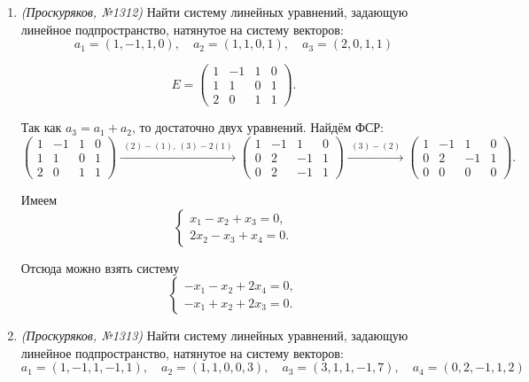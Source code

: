 \begin{enumerate}
Следовательно, искомая система уравнений может быть записана так:
\[
\begin{cases}
    -x_1 - x_2 + x_5 = 0,\\
    -2x_1 + x_2 + x_4 = 0,\\
    -2x_2 + x_3 = 0.
\end{cases}
\]

\item \textit{(Проскуряков, №1312)} Найти систему линейных уравнений, задающую линейное подпространство, натянутое на систему векторов:
\[
a_1 = (1, -1, 1, 0), \quad a_2 = (1, 1, 0, 1), \quad a_3 = (2, 0, 1, 1)
\]

\[
E =
\begin{pmatrix}
    1 & -1 & 1 & 0 \\
    1 & 1 & 0 & 1 \\
    2 & 0 & 1 & 1
\end{pmatrix}.
\]

Так как $a_3=a_1+a_2$, то достаточно двух уравнений. Найдём ФСР:
\[
\begin{pmatrix}
    1 & -1 & 1 & 0 \\
    1 & 1 & 0 & 1 \\
    2 & 0 & 1 & 1
\end{pmatrix}
\xrightarrow{\,\, (2)-(1),\ (3)-2(1) \,\,}
\begin{pmatrix}
    1 & -1 & 1 & 0 \\
    0 & 2 & -1 & 1 \\
    0 & 2 & -1 & 1
\end{pmatrix}
\xrightarrow{\,\, (3)-(2) \,\,}
\begin{pmatrix}
    1 & -1 & 1 & 0 \\
    0 & 2 & -1 & 1 \\
    0 & 0 & 0 & 0
\end{pmatrix}.
\]

Имеем
\[
\begin{cases}
    x_1 - x_2 + x_3 = 0,\\
    2x_2 - x_3 + x_4 = 0.
\end{cases}
\]

Отсюда можно взять систему
\[
\begin{cases}
    -x_1 - x_2 + 2x_4 = 0,\\
    -x_1 + x_2 + 2x_3 = 0.
\end{cases}
\]

\item \textit{(Проскуряков, №1313)} Найти систему линейных уравнений, задающую линейное подпространство, натянутое на систему векторов:
\[
a_1 = (1, -1, 1, -1, 1), \quad a_2 = (1, 1, 0, 0, 3), \quad a_3 = (3, 1, 1, -1, 7), \quad a_4 = (0, 2, -1, 1, 2)
\]


\end{enumerate}
